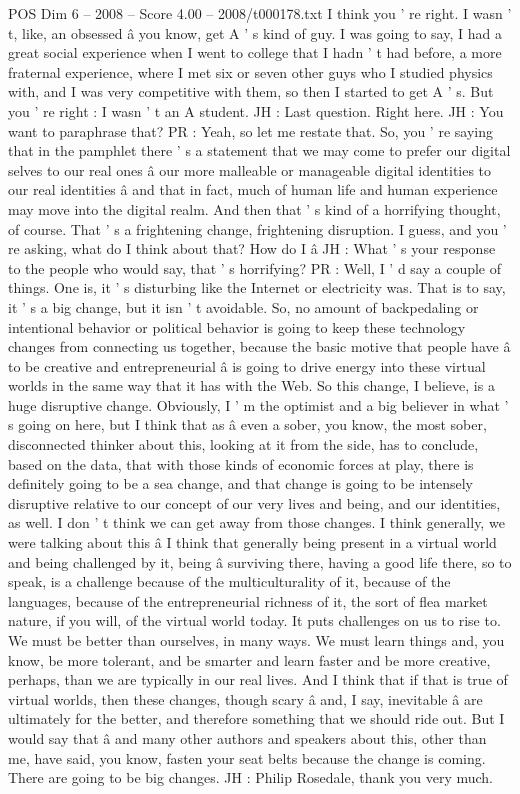 \begin{textsample}{POS Dim 6 – 2008 – Score 4.00 – 2008/t000178.txt}
I think you ' re right.
I wasn ' t, like, an obsessed â you know, get A ' s kind of guy.
I was going to say, I had a great social experience when I went to college that I hadn ' t had before, a more fraternal experience, where I met six or seven other guys who I studied physics with, and I was very competitive with them, so then I started to get A ' s.
But you ' re right : I wasn ' t an A student.
JH : Last question.
Right here.
JH : You want to paraphrase that?
PR : Yeah, so let me restate that.
So, you ' re saying that in the pamphlet there ' s a statement that we may come to prefer our digital selves to our real ones â our more malleable or manageable digital identities to our real identities â and that in fact, much of human life and human experience may move into the digital realm.
And then that ' s kind of a horrifying thought, of course.
That ' s a frightening change, frightening disruption.
I guess, and you ' re asking, what do I think about that?
How do I â JH : What ' s your response to the people who would say, that ' s horrifying?
PR : Well, I ' d say a couple of things.
One is, it ' s disturbing like the Internet or electricity was.
That is to say, it ' s a big change, but it isn ' t avoidable.
So, no amount of backpedaling or intentional behavior or political behavior is going to keep these technology changes from connecting us together, because the basic motive that people have â to be creative and entrepreneurial â is going to drive energy into these virtual worlds in the same way that it has with the Web.
So this change, I believe, is a huge disruptive change.
Obviously, I ' m the optimist and a big believer in what ' s going on here, but I think that as â even a sober, you know, the most sober, disconnected thinker about this, looking at it from the side, has to conclude, based on the data, that with those kinds of economic forces at play, there is definitely going to be a sea change, and that change is going to be intensely disruptive relative to our concept of our very lives and being, and our identities, as well.
I don ' t think we can get away from those changes.
I think generally, we were talking about this â I think that generally being present in a virtual world and being challenged by it, being â surviving there, having a good life there, so to speak, is a challenge because of the multiculturality of it, because of the languages, because of the entrepreneurial richness of it, the sort of flea market nature, if you will, of the virtual world today.
It puts challenges on us to rise to.
We must be better than ourselves, in many ways.
We must learn things and, you know, be more tolerant, and be smarter and learn faster and be more creative, perhaps, than we are typically in our real lives.
And I think that if that is true of virtual worlds, then these changes, though scary â and, I say, inevitable â are ultimately for the better, and therefore something that we should ride out.
But I would say that â and many other authors and speakers about this, other than me, have said, you know, fasten your seat belts because the change is coming.
There are going to be big changes.
JH : Philip Rosedale, thank you very much.

\end{textsample}
